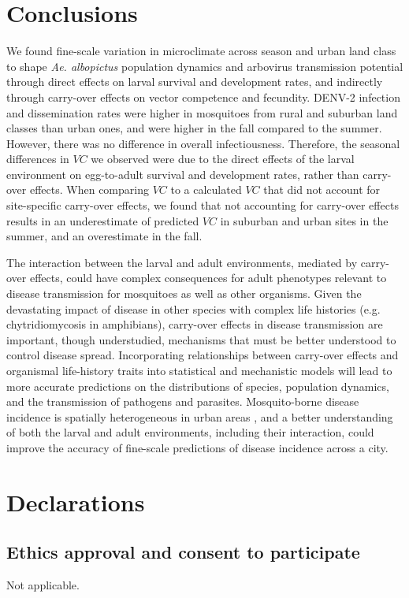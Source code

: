 \documentclass[12pt]{article}
\begin{document}
\section*{Conclusions}

We found fine-scale variation in microclimate across season and urban land class to shape \textit{Ae. albopictus} population dynamics and arbovirus transmission potential through direct effects on larval survival and development rates, and indirectly through carry-over effects on vector competence and fecundity.
DENV-2 infection and dissemination rates were higher in mosquitoes from rural and suburban land classes than urban ones, and were higher in the fall compared to the summer.
However, there was no difference in overall infectiousness.
Therefore, the seasonal differences in $VC$ we observed were due to the direct effects of the larval environment on egg-to-adult survival and development rates, rather than carry-over effects.
When comparing $VC$ to a calculated $VC$ that did not account for site-specific carry-over effects, we found that not accounting for carry-over effects results in an underestimate of predicted $VC$ in suburban and urban sites in the summer, and an overestimate in the fall.

The interaction between the larval and adult environments, mediated by carry-over effects, could have complex consequences for adult phenotypes relevant to disease transmission for mosquitoes as well as other organisms.
Given the devastating impact of disease in other species with complex life histories (e.g. chytridiomycosis in amphibians), carry-over effects in disease transmission are important, though understudied, mechanisms that must be better understood to control disease spread.
Incorporating relationships between carry-over effects and organismal life-history traits into statistical and mechanistic models will lead to more accurate predictions on the distributions of species, population dynamics, and the transmission of pathogens and parasites.
Mosquito-borne disease incidence is spatially heterogeneous in urban areas \cite{santos-vega2016}, and a better understanding of both the larval and adult environments, including their interaction, could improve the accuracy of fine-scale predictions of disease incidence across a city.

\section*{Declarations}
\subsection*{Ethics approval and consent to participate}
Not applicable.
\end{document}
